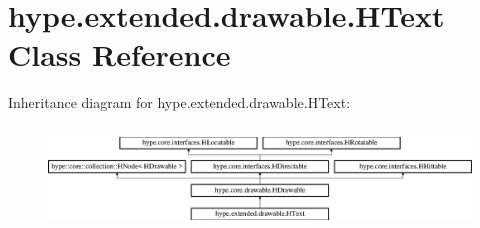 \hypertarget{classhype_1_1extended_1_1drawable_1_1_h_text}{\section{hype.\-extended.\-drawable.\-H\-Text Class Reference}
\label{classhype_1_1extended_1_1drawable_1_1_h_text}
}
Inheritance diagram for hype.\-extended.\-drawable.\-H\-Text\-:\begin{figure}[H]
\begin{center}
\leavevmode
\includegraphics[height=2.745098cm]{classhype_1_1extended_1_1drawable_1_1_h_text}
\end{center}
\end{figure}
